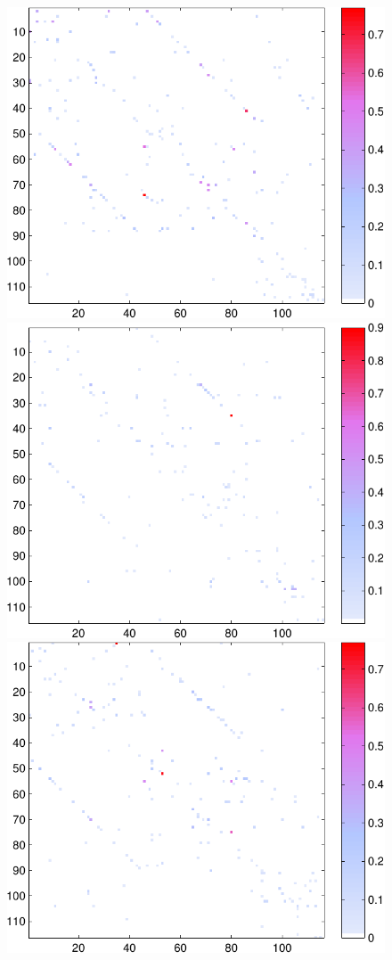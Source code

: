 \documentclass[a4paper, 10pt, english, onecolumn]{article}
\begin{document}
\begin{figure}[h!]
  \includegraphics[height=0.26\textheight]{images/new/assym_subj4_expl-crop}
  \includegraphics[height=0.26\textheight]{images/new/assym_subj5_expl-crop}
  \includegraphics[height=0.26\textheight]{images/new/assym_subj6_expl-crop}

\end{figure}
\end{document}
